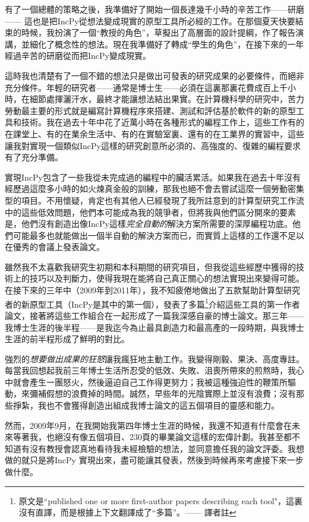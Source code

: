 \documentclass[12pt,UTF8,nofonts]{book}
\begin{document}
有了一個總體的策略之後，我準備好了開始一個長達幾千小時的辛苦工作——研磨—— 這也是把IncPy從想法變成現實的原型工具所必經的工作。在那個夏天快要結束的時候，我扮演了一個“教授的角色”，草擬出了高層面的設計提綱，作了報告演講，並細化了概念性的想法。現在我準備好了轉成“學生的角色”，在接下來的一年經過辛苦的研磨從而把IncPy變成現實。

\breakline

這時我也清楚有了一個不錯的想法只是做出可發表的研究成果的必要條件，而絕非充分條件。年輕的研究者——通常是博士生——必須在這裏那裏花費成百上千小時，在細節處揮灑汗水，最終才能讓想法結出果實。在計算機科學的研究中，苦力勞動最主要的形式就是編寫計算機程序來搭建、測試和評估基於軟件的新的原型工具和技術。我在過去十年中花了近萬小時在各種形式的編程工作上，這些工作有的在課堂上、有的在業余生活中、有的在實驗室裏、還有的在工業界的實習中，這些讓我對實現一個類似IncPy這樣的研究創意所必須的、高強度的、復雜的編程要求有了充分準備。

實現IncPy包含了一些我從未完成過的編程中的臟活累活。如果我在過去十年沒有經歷過這麼多小時的如火煉真金般的訓練，那我也絕不會去嘗試這麼一個勞動密集型的項目。不用懷疑，肯定也有其他人已經發現了我所註意到的計算型研究工作流中的這些低效問題，他們本可能成為我的競爭者，但將我與他們區分開來的要素是，他們沒有創造出像IncPy這樣\emph{完全自動的}解決方案所需要的深厚編程功底。他們可能最多也就能做出一個半自動的解決方案而已，而實質上這樣的工作還不足以在優秀的會議上發表論文。

雖然我不太喜歡我研究生初期和本科期間的研究項目，但我從這些經歷中獲得的技術上的技巧以及判斷力，使得我現在能將自己真正關心的想法實現出來變得可能。在接下來的三年中（2009年到2011年），我不知疲倦地做出了五款幫助計算型研究者的新原型工具（IncPy是其中的第一個），發表了多篇\footnote{原文是``published one or more first-author papers describing each tool"，這裏沒有直譯，而是根據上下文翻譯成了“多篇”。—— 譯者註}介紹這些工具的第一作者論文，接著將這些工作組合在一起形成了一篇我深感自豪的博士論文。那三年——我博士生涯的後半程——是我迄今為止最具創造力和最高產的一段時期，與我博士生涯的前半程形成了鮮明的對比。

強烈的\emph{想要做出成果的狂怒}讓我瘋狂地主動工作。我變得剛毅、果決、高度專註。每當我回想起我前三年博士生活所忍受的低效、失敗、沮喪所帶來的煎熬時，我心中就會產生一團怒火，然後逼迫自己工作得更努力；我被這種強迫性的鞭策所驅動，來彌補假想的浪費掉的時間。誠然，早些年的光陰實際上並沒有浪費；沒有那些掙紮，我也不會獲得創造出組成我博士論文的這五個項目的靈感和能力。

\breakline

然而，2009年9月，在我開始我第四年博士生涯的時候，我還不知道有什麼會在未來等著我，也絕沒有像五個項目、230頁的畢業論文這樣的宏偉計劃。我甚至都不知道有沒有教授會認真地看待我未經檢驗的想法，並同意擔任我的論文評委。我想做的就只是將IncPy 實現出來，盡可能讓其發表，然後到時候再來考慮接下來一步做什麼。
\end{document}

